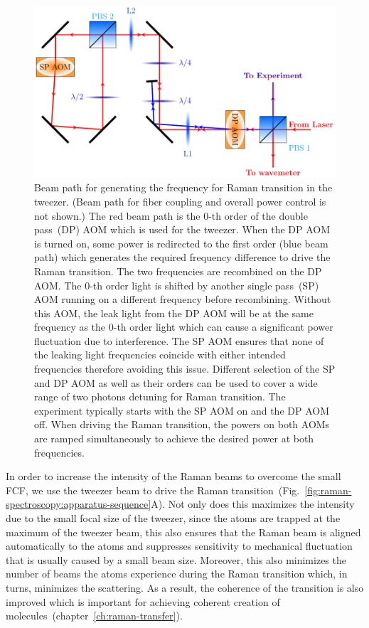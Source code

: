 \begin{figure}
  \centering
  \includegraphics[width=\textwidth]{figures/raman_spectroscopy_raman_beampath.pdf}
  \caption[Beam path to allow driving Raman transition with tweezer]{
    Beam path for generating the frequency for Raman transition in the tweezer.
    (Beam path for fiber coupling and overall power control is not shown.)
    The red beam path is the $0$-th order of the double pass~(DP) AOM
    which is used for the tweezer.
    When the DP AOM is turned on, some power is redirected to the first order
    (blue beam path) which generates the required frequency difference to drive
    the Raman transition. The two frequencies are recombined on the DP AOM.
    The $0$-th order light is shifted by another single pass~(SP) AOM
    running on a different frequency before recombining.
    Without this AOM, the leak light from the DP AOM will be at the same frequency
    as the $0$-th order light which can cause a significant power fluctuation
    due to interference. The SP AOM ensures that none of the leaking light frequencies
    coincide with either intended frequencies therefore avoiding this issue.
    Different selection of the SP and DP AOM as well as their orders can be used
    to cover a wide range of two photons detuning for Raman transition.
    The experiment typically starts with the SP AOM on and the DP AOM off.
    When driving the Raman transition, the powers on both AOMs are ramped simultaneously
    to achieve the desired power at both frequencies.
    \label{fig:raman-spectroscopy:raman-beampath}}
\end{figure}

In order to increase the intensity of the Raman beams to overcome the small FCF,
we use the tweezer beam to drive
the Raman transition~(Fig.~\ref{fig:raman-spectroscopy:apparatus-sequence}A).
Not only does this maximizes the intensity due to the small focal size of the tweezer,
since the atoms are trapped at the maximum of the tweezer beam,
this also ensures that the Raman beam is aligned automatically to the atoms
and suppresses sensitivity to mechanical fluctuation that is usually
caused by a small beam size.
Moreover, this also minimizes the number of beams the atoms experience
during the Raman transition which, in turns, minimizes the scattering.
As a result, the coherence of the transition is also improved
which is important for achieving
coherent creation of molecules~(chapter~\ref{ch:raman-transfer}).

